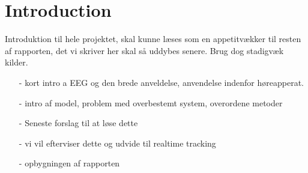 \chapter*{Introduction}\label{ch:introduction}
Introduktion til hele projektet, skal kunne læses som en appetitvækker til resten af rapporten, det vi skriver her skal så uddybes senere. Brug dog stadigvæk kilder.

\begin{itemize}
\item[-] kort intro a EEG og den brede anveldelse, anvendelse indenfor høreapperat. 
\item[-] intro af model, problem med overbestemt system, overordene metoder 
\item[-] Seneste forslag til at løse dette 
\item[-] vi vil efterviser dette og udvide til realtime tracking
\item[-] opbygningen af rapporten
\end{itemize}

